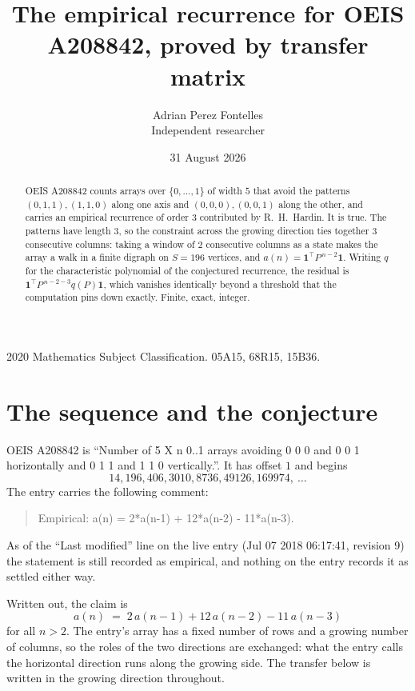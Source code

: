 \documentclass[11pt,a4paper]{article}
\title{The empirical recurrence for OEIS A208842, proved by transfer matrix}
\author{Adrian Perez Fontelles\\ \small Independent researcher}
\date{31 August 2026}
\theoremstyle{plain}
\theoremstyle{definition}
\begin{document}
\maketitle

\begin{abstract}
OEIS A208842 counts arrays over $\{0,\dots,1\}$ of width $5$ that avoid the patterns
$(0,1,1), (1,1,0)$ along one axis and $(0,0,0), (0,0,1)$ along the other, and carries an empirical recurrence of
order $3$ contributed by R.~H.~Hardin. It is true. The patterns have length $3$, so
the constraint across the growing direction ties together $3$ consecutive columns: taking a
window of $2$ consecutive columns as a state makes the array a walk in a finite digraph
on $S=196$ vertices, and $a(n)=\mathbf{1}^{\!\top}P^{\,n-2}\mathbf{1}$. Writing $q$
for the characteristic polynomial of the conjectured recurrence, the residual is
$\mathbf{1}^{\!\top}P^{\,n-2-3}q(P)\mathbf{1}$, which vanishes identically
beyond a threshold that the computation pins down exactly. Finite, exact, integer.
\end{abstract}

\noindent\small 2020 Mathematics Subject Classification. 05A15, 68R15, 15B36.\normalsize

\section{The sequence and the conjecture}

OEIS A208842 is ``Number of 5 X n 0..1 arrays avoiding 0 0 0 and 0 0 1 horizontally and 0 1 1 and 1 1 0 vertically.''. It has offset
$1$ and begins
\[
14, 196, 406, 3010, 8736, 49126, 169974,\ \dots
\]
The entry carries the following comment:
\begin{quote}\small
Empirical: a(n) = 2*a(n-1) + 12*a(n-2) - 11*a(n-3).
\end{quote}
As of the ``Last modified'' line on the live entry (Jul 07 2018 06:17:41, revision
9) the statement is still recorded as empirical, and nothing on the entry
records it as settled either way.

Written out, the claim is
\begin{equation}\label{eq:conj}
a(n)\;=\;2\,a(n-1) + 12\,a(n-2) - 11\,a(n-3)
\end{equation}
for all $n>2$. The entry's array has a fixed number of rows and a growing number of
columns, so the roles of the two directions are exchanged: what the entry calls the
horizontal direction runs along the growing side. The transfer below is written in the
growing direction throughout.
\end{document}
